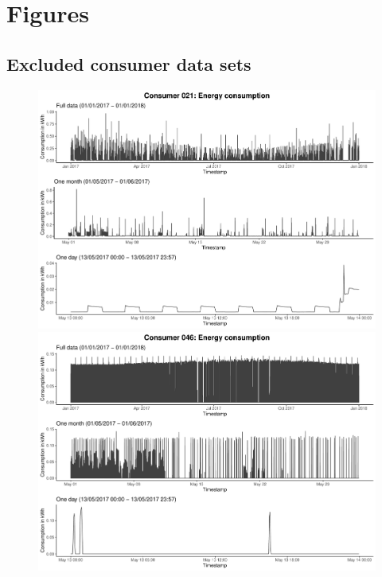 
\section{Figures}\label{App:Figures}

\subsection{Excluded consumer data sets}\label{App:Figures:Excluded}

\begin{centering}
\begin{figure}[!htbp]
        \includegraphics[width=\textwidth-0.85cm]{thesis/graphs/timeseries/c021_cons.pdf}\vspace{0.3cm}
        \includegraphics[width=\textwidth-0.85cm]{thesis/graphs/timeseries/c046_cons.pdf}

\end{figure}
\end{centering}
